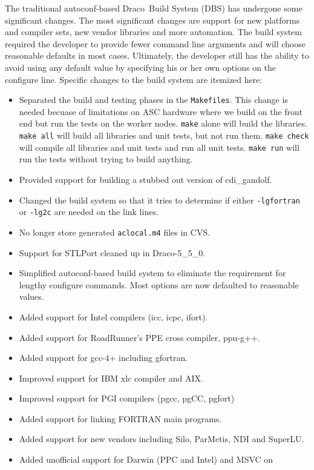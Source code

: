 \documentclass[note]{ResearchNote}
\newcommand{\draco}{Draco}
\newcommand{\CVS}{\textsf{CVS}}
\begin{document}
The traditional autoconf-based \draco\ Build System (DBS) has
undergone some significant changes.  The most significant changes are
support for new platforms and compiler sets, new vendor libraries and
more automation.  The build system required the developer to provide
fewer command line arguments and will choose reasonable defaults in
most cases.  Ultimately, the developer still has the ability to avoid
using any default value by specifying his or her own options on the
configure line.  Specific changes to the build system are itemized
here: 
\begin{itemize}
\item Separated the build and testing phases in the
  \texttt{Makefiles}.  This change is needed becuase of limitations on
  ASC hardware where we build on the front end but run the tests on
  the worker nodes.  \texttt{make} alone will build the libraries.
  \texttt{make all} will build all libraries and unit tests, but not
  run them.   \texttt{make check} will compile all libraries and unit
  tests and run all unit tests.  \texttt{make run} will run the tests
  without trying to build anything.
\item Provided support for building a stubbed out version of
  \textsf{cdi\_gandolf}.
\item Changed the build system so that it tries to determine if either
  \texttt{-lgfortran} or \texttt{-lg2c} are needed on the link lines.
\item No longer store generated \texttt{aclocal.m4} files in \CVS.
\item Support for STLPort cleaned up in \draco-5\_5\_0.
\item Simplified autoconf-based build system to eliminate the
  requirement for lengthy configure commands.  Most options are now
  defaulted to reasonable values.
\item Added support for Intel compilers (icc, icpc, ifort).
\item Added support for RoadRunner's PPE cross compiler, ppu-g++.
\item Added support for gcc-4+ including gfortran.
\item Improved support for IBM xlc compiler and AIX.
\item Improved support for PGI compilers (pgcc, pgCC, pgfort)
\item Added support for linking FORTRAN main programs.
\item Added support for new vendors including Silo, ParMetis, NDI and
  SuperLU.
\item Added unofficial support for Darwin (PPC and Intel) and MSVC on

\end{itemize}
\end{document}

